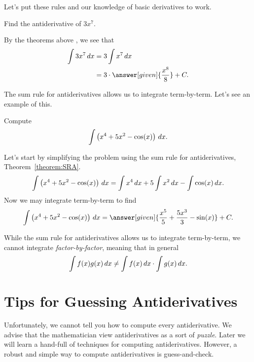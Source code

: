 \documentclass{ximera}
\begin{document}
Let's put these rules and our knowledge of basic derivatives to work.

\begin{example}
Find the antiderivative of $3 x^7$.
\begin{explanation}
By the theorems above , we see that
\begin{align*}
\int 3 x^7 \d x &= 3 \int x^7 \d x\\
&= 3 \cdot \answer[given]{\frac{x^8}{8}}+C.
\end{align*}
\end{explanation}
\end{example}

The sum rule for antiderivatives allows us to integrate
term-by-term. Let's see an example of this.

\begin{example}
Compute
\[
\int \left(x^4 + 5x^2 - \cos(x)\right) \,d x.
\]
\begin{explanation}
Let's start by simplifying the problem using the sum rule for
antiderivatives, Theorem~\ref{theorem:SRA}.
\[
\int \left(x^4 + 5x^2 - \cos(x)\right) \,d x = \int x^4 \,d x + 5\int x^2 \,d x - \int \cos(x) \,d x.
\]
Now we may integrate term-by-term to find
\[
\int \left(x^4 + 5x^2 - \cos(x)\right) \d x = \answer[given]{\frac{x^5}{5} + \frac{5x^3}{3}  - \sin(x)}+C.
\]
\end{explanation}
\end{example}


\begin{warning}
While the sum rule for antiderivatives allows us to integrate
term-by-term, we cannot integrate \textit{factor-by-factor}, meaning
that in general
\[
\int f(x)g(x) \,d x \ne \int f(x) \,d x\cdot \int g(x) \,d x.
\]
\end{warning}








\section{Tips for Guessing Antiderivatives}


Unfortunately, we cannot tell you how to compute every antiderivative.
We advise that the mathematician view antiderivatives as a sort of
\textit{puzzle}. Later we will learn a hand-full of techniques for
computing antiderivatives. However, a robust and simple way to compute
antiderivatives is guess-and-check.
\end{document}

